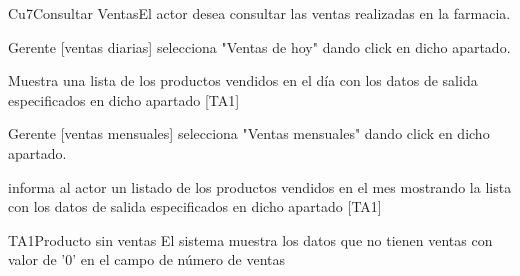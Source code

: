 \begin{UseCase}{Cu7}{Consultar Ventas}{El actor desea consultar las ventas realizadas en la farmacia.}
{    }
    
\end{UseCase}

\begin{UCtrayectoria}{Gerente  [ventas diarias]}
        \UCpaso[\UCactor] selecciona "Ventas de hoy" dando click en dicho apartado.
        
        \UCpaso Muestra una lista de los productos vendidos en el día con los datos de salida especificados en dicho apartado [TA1]

\end{UCtrayectoria}


\begin{UCtrayectoria}{Gerente  [ventas mensuales]}
        \UCpaso[\UCactor] selecciona "Ventas mensuales" dando click en dicho apartado.
        
        \UCpaso informa al actor un listado  de los productos vendidos en el mes mostrando la lista con los datos de salida especificados en dicho apartado [TA1]

\end{UCtrayectoria}

\begin{UCtrayectoriaA}{TA1}{Producto sin ventas}
    \UCpaso El sistema muestra los datos que no tienen ventas con valor de '0' en el campo de número de ventas
    \end{UCtrayectoriaA}
    
